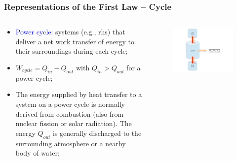 \documentclass[10pt,compress]{beamer}
\begin{document}
\begin{frame}
 \frametitle{Representations of the First Law -- Cycle}
 \begin{columns}
  \begin{column}[l]{0.5\linewidth}
   \begin{itemize}
    \item <1-> \textcolor{blue}{Power cycle}: systems (e.g., rhs) that deliver a net work transfer of energy to their surroundings during each cycle;
    \item <2-> $W_{cycle} = Q_{in} - Q_{out}$ with $Q_{in} > Q_{out}$ for a power cycle;
    \item <3-> The energy supplied by heat transfer to a system on a power cycle is normally derived from combustion (also from nuclear fission or solar radiation). The energy $Q_{out}$ is generally discharged to the surrounding atmosphere or a nearby body of water;
   \end{itemize}
  \end{column}
   
  \begin{column}[l]{0.5\linewidth}
   \begin{figure}%
    \begin{center}
     \includegraphics[width=8.cm,clip]{./Pics/FirstLaw_Cycle_01}
    \end{center}
   \end{figure}    
  \end{column}
 \end{columns}
 \normalsize
\end{frame}
\end{document}
